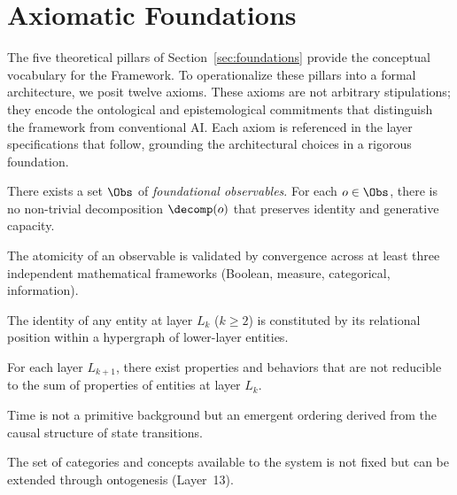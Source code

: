 \section{Axiomatic Foundations}
\label{sec:axioms}

The five theoretical pillars of Section~\ref{sec:foundations} provide the conceptual vocabulary for the \Apeiron{} Framework. To operationalize these pillars into a formal architecture, we posit twelve axioms. These axioms are not arbitrary stipulations; they encode the ontological and epistemological commitments that distinguish the framework from conventional AI. Each axiom is referenced in the layer specifications that follow, grounding the architectural choices in a rigorous foundation.

\begin{axiom}[Irreducibility]\label{ax:irred}
There exists a set $\Obs$ of \emph{foundational observables}. For each $o \in \Obs$, there is no non-trivial decomposition $\decomp(o)$ that preserves identity and generative capacity.
\end{axiom}

\begin{axiom}\label{ax:multi}
The atomicity of an observable is validated by convergence across at least three independent mathematical frameworks (Boolean, measure, categorical, information).
\end{axiom}

\begin{axiom}\label{ax:relational}
The identity of any entity at layer $L_k$ ($k \ge 2$) is constituted by its relational position within a hypergraph of lower-layer entities.
\end{axiom}

\begin{axiom}[Emergence]\label{ax:emergence}
For each layer $L_{k+1}$, there exist properties and behaviors that are not reducible to the sum of properties of entities at layer $L_k$.
\end{axiom}

\begin{axiom}\label{ax:time}
Time is not a primitive background but an emergent ordering derived from the causal structure of state transitions.
\end{axiom}

\begin{axiom}\label{ax:openness}
The set of categories and concepts available to the system is not fixed but can be extended through ontogenesis (Layer~13).
\end{axiom}


